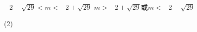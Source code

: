 \begin{QUESTIONS}
\begin{QUESTION}
\begin{QBODY}
\begin{QOPS}
                \QOP $-2-\sqrt{29}<m<-2+\sqrt{29}$
                \QOP $m>-2+\sqrt{29}$或$m<-2-\sqrt{29}$
            \end{QOPS}
        \end{QBODY}
        \begin{QFROMS}
        \end{QFROMS}
        \begin{QTAGS}\end{QTAGS}
        \begin{QANS}
            (2)
        \end{QANS}
        \begin{QSOLLIST}
        \end{QSOLLIST}
        \begin{QEMPTYSPACE}
        \end{QEMPTYSPACE}
    \end{QUESTION}
\end{QUESTIONS}
